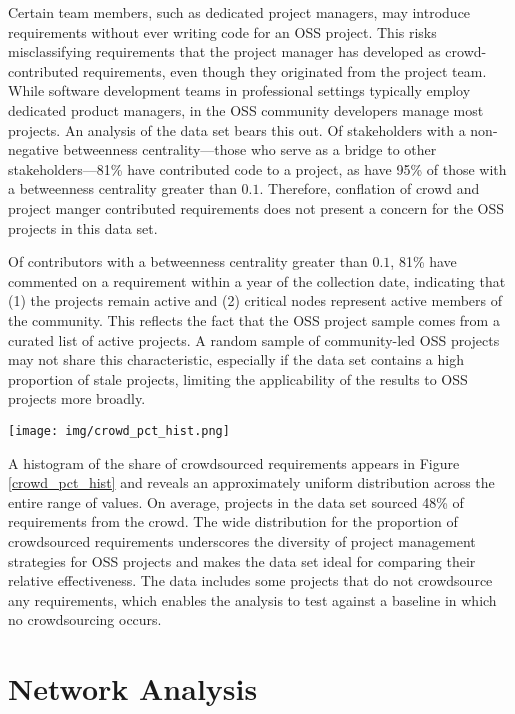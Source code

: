 Certain team members, such as dedicated project managers, may introduce requirements without ever writing code for an OSS project. This risks misclassifying requirements that the project manager has developed as crowd-contributed requirements, even though they originated from the project team. While software development teams in professional settings typically employ dedicated product managers, in the OSS community developers manage most projects. An analysis of the data set bears this out. Of stakeholders with a non-negative betweenness centrality---those who serve as a bridge to other stakeholders---81\% have contributed code to a project, as have 95\% of those with a betweenness centrality greater than $0.1$. Therefore, conflation of crowd and project manger contributed requirements does not present a concern for the OSS projects in this data set.

Of contributors with a betweenness centrality greater than $0.1$, 81\% have commented on a requirement within a year of the collection date, indicating that (1) the projects remain active and (2) critical nodes represent active members of the community. This reflects the fact that the OSS project sample comes from a curated list of active projects. A random sample of community-led OSS projects may not share this characteristic, especially if the data set contains a high proportion of stale projects, limiting the applicability of the results to OSS projects more broadly.

\begin{figure*}
  \texttt{[image: img/crowd\_pct\_hist.png]}
\caption{Histogram for the share of crowdsourced requirements}
\label{crowd_pct_hist}
\end{figure*}

A histogram of the share of crowdsourced requirements appears in Figure \ref{crowd_pct_hist} and reveals an approximately uniform distribution across the entire range of values. On average, projects in the data set sourced 48\% of requirements from the crowd. The wide distribution for the proportion of crowdsourced requirements underscores the diversity of project management strategies for OSS projects and makes the data set ideal for comparing their relative effectiveness. The data includes some projects that do not crowdsource any requirements, which enables the analysis to test against a baseline in which no crowdsourcing occurs.

\section{Network Analysis}

